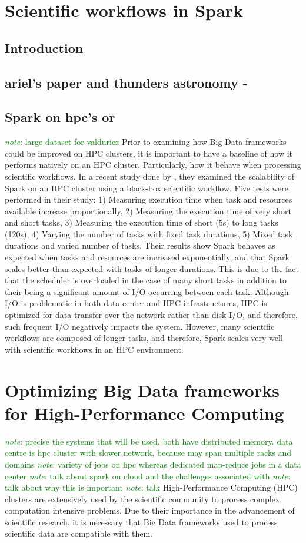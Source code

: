 \documentclass{report}
\newcommand{\note}[1]{\textcolor{green}{\textit{note}: #1}}
\begin{document}
\chapter{Scientific workflows in Spark}
	\section{Introduction}
	\section{ariel's paper and thunders astronomy - }
	\section{Spark on hpc's or }
	\note{large dataset for valduriez}
	Prior to examining how Big Data frameworks could be improved on HPC clusters, it is important to have a baseline of how it performs natively on an HPC cluster. Particularly, how it behave when processing scientific workflows. In a recent study done by \cite{valduriez}, they examined the scalability of Spark on an HPC cluster using a black-box scientific workflow. Five tests were performed in their study: 1) Measuring execution time when task and resources available increase proportionally, 2) Measuring the execution time of very short and short tasks, 3) Measuring the execution time of short (5s) to long tasks (120s), 4) Varying the number of tasks with fixed task durations, 5) Mixed task durations and varied number of tasks. Their results show Spark behaves as expected when tasks and resources are increased exponentially, and that Spark scales better than expected with tasks of longer durations. This is due to the fact that the scheduler is overloaded in the case of many short tasks in addition to their being a significant amount of I/O occurring between each task. Although I/O is problematic in both data center and HPC infrastructures, HPC is optimized for data transfer over the network rather than disk I/O, and therefore, such frequent I/O negatively impacts the system. However, many scientific workflows are composed of longer tasks, and therefore, Spark scales very well with scientific workflows in an HPC environment.

\chapter{Optimizing Big Data frameworks for High-Performance Computing}
	
	\note{precise the systems that will be used. both have distributed memory. data centre is hpc cluster with slower network, because may span multiple racks and domains}
	\note{variety of jobs on hpc whereas dedicated map-reduce jobs in a data center}
	\note{talk about spark on cloud and the challenges associated with}
	\note{talk about why this is important}
	\note{talk }
	High-Performance Computing (HPC) clusters are extensively used by the scientific community to process complex, computation intensive problems. Due to their importance in the advancement of scientific research, it is necessary that Big Data frameworks used to process scientific data are compatible with them. 
	
\end{document}
